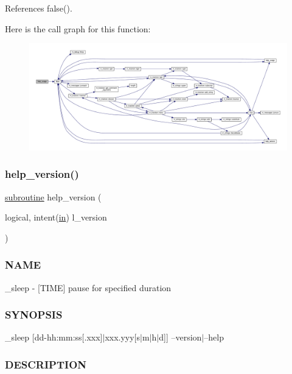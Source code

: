 References false().

Here is the call graph for this function\+:
\nopagebreak
\begin{figure}[H]
\begin{center}
\leavevmode
\includegraphics[width=350pt]{__sleep_8f90_a3e09a3b52ee8fb04eeb93fe5761626a8_cgraph}
\end{center}
\end{figure}
\mbox{\label{__sleep_8f90_a39c21619b08a3c22f19e2306efd7f766}} 
\subsubsection{\texorpdfstring{help\+\_\+version()}{help\_version()}}
{\footnotesize\ttfamily \hyperlink{M__stopwatch_83_8txt_acfbcff50169d691ff02d4a123ed70482}{subroutine} help\+\_\+version (\begin{DoxyParamCaption}\item[{logical, intent(\hyperlink{M__journal_83_8txt_afce72651d1eed785a2132bee863b2f38}{in})}]{l\+\_\+version }\end{DoxyParamCaption})}



\subsubsection*{N\+A\+ME}

\+\_\+sleep -\/ \mbox{[}T\+I\+ME\mbox{]} pause for specified duration \subsubsection*{S\+Y\+N\+O\+P\+S\+IS}

\+\_\+sleep \mbox{[}dd-\/hh\+:mm\+:ss\mbox{[}.xxx\mbox{]}$\vert$xxx.yyy\mbox{[}s$\vert$m$\vert$h$\vert$d\mbox{]}\mbox{]} --version$\vert$--help \subsubsection*{D\+E\+S\+C\+R\+I\+P\+T\+I\+ON}

